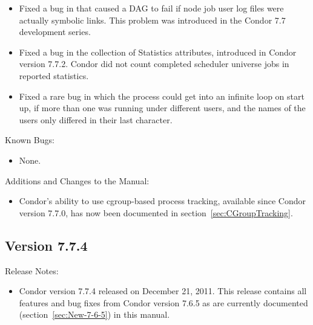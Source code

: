 \begin{itemize}
\item Fixed a bug in  that caused a DAG to fail if node
job user log files were actually symbolic links.  
This problem was introduced in the Condor 7.7 development series.

\item Fixed a bug in the collection of Statistics attributes,
introduced in Condor version 7.7.2.
Condor did not count completed scheduler universe jobs in reported statistics.

\item Fixed a rare bug in which the  process could get
into an infinite loop on start up,
if more than one  was running under different users,
and the names of the users only differed in their last character.

\end{itemize}

\noindent Known Bugs:

\begin{itemize}

\item None.

\end{itemize}

\noindent Additions and Changes to the Manual:

\begin{itemize}

\item Condor's ability to use cgroup-based process tracking,
available since Condor version 7.7.0,
has now been documented in section~\ref{sec:CGroupTracking}.

\end{itemize}


\subsection*{\label{sec:New-7-7-4}Version 7.7.4}

\noindent Release Notes:

\begin{itemize}

\item Condor version 7.7.4 released on December 21, 2011.
This release contains all features and bug fixes from Condor version 7.6.5 
as are currently documented (section~\ref{sec:New-7-6-5}) in this manual. 

\end{itemize}


